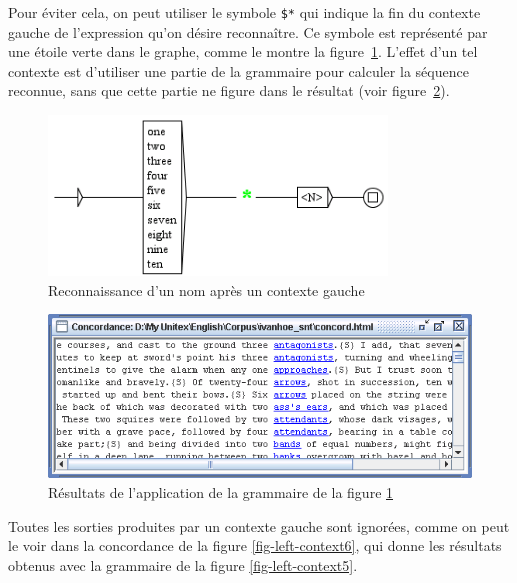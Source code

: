 \bigskip
\noindent Pour éviter cela, on peut utiliser le symbole \verb+$*+ qui indique la fin du contexte
gauche de l'expression qu'on désire reconnaître. Ce symbole est représenté par une étoile verte
dans le graphe, comme le montre la figure~\ref{fig-left-context3}. L'effet d'un tel contexte est
d'utiliser une partie de la grammaire pour calculer la séquence reconnue, sans que cette partie ne figure dans le résultat (voir figure~\ref{fig-left-context4}).

\begin{figure}[!ht]
\begin{center}
\includegraphics[width=9cm]{resources/img/fig6-17c.png}
\caption{Reconnaissance d'un nom après un contexte gauche\label{fig-left-context3}}
\end{center}
\end{figure}

\begin{figure}[!ht]
\begin{center}
\includegraphics[width=14cm]{resources/img/fig6-17d.png}
\caption{Résultats de l'application de la grammaire de la figure
\ref{fig-left-context3}\label{fig-left-context4}}
\end{center}
\end{figure}

\clearpage
\noindent Toutes les sorties produites par un contexte gauche sont ignorées, comme on peut le voir dans la concordance de la figure \ref{fig-left-context6}, qui donne les résultats
obtenus avec la grammaire de la figure \ref{fig-left-context5}.

